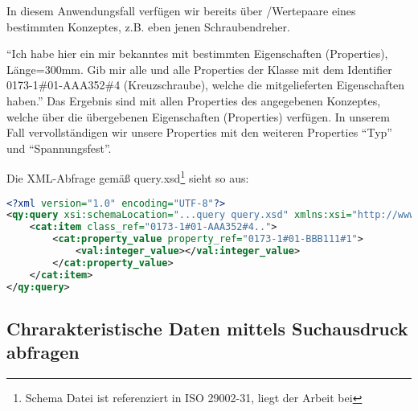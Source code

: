 In diesem Anwendungsfall verfügen wir bereits über /Wertepaare eines bestimmten Konzeptes, z.B. eben jenen Schraubendreher.

\enquote{Ich habe hier ein mir bekanntes  mit bestimmten Eigenschaften (Properties), Länge=300mm. Gib mir alle  und alle Properties der Klasse mit dem Identifier 0173-1\#01-AAA352\#4 (Kreuzschraube), welche die mitgelieferten Eigenschaften haben.}
Das Ergebnis sind  mit allen Properties des angegebenen Konzeptes, welche über die übergebenen Eigenschaften (Properties) verfügen. In unserem Fall vervollständigen wir unsere Properties mit den weiteren Properties \enquote{Typ} und \enquote{Spannungsfest}.

Die XML-Abfrage gemäß query.xsd\footnote{Schema Datei ist referenziert in ISO 29002-31, liegt der Arbeit bei} sieht so aus:

\begin{lstlisting}[caption=Query Beispiel - Daten validieren, language=XML, label=UseCaseDatenvalidieren]
<?xml version="1.0" encoding="UTF-8"?>
<qy:query xsi:schemaLocation="...query query.xsd" xmlns:xsi="http://www.w3.org/2001/XMLSchema-instance" xmlns:cat="...catalogue" xmlns:val="...value" xmlns:qy="...query" xmlns:bas="...basic">
	<cat:item class_ref="0173-1#01-AAA352#4..">
		<cat:property_value property_ref="0173-1#01-BBB111#1">
			<val:integer_value></val:integer_value>
		</cat:property_value>
	</cat:item>
</qy:query>
\end{lstlisting}

\subsection{Chrarakteristische Daten mittels Suchausdruck abfragen }

